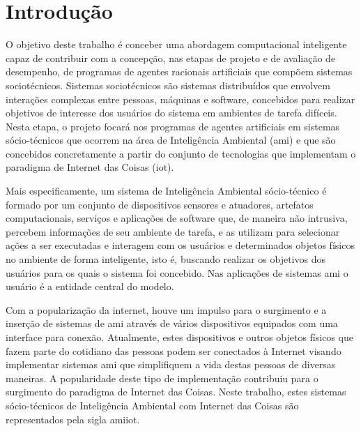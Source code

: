  \chapter{Introdução}
\label{cap:introducao}
    
    

    O objetivo deste trabalho é conceber uma abordagem computacional inteligente capaz de contribuir com a concepção, nas etapas de projeto e de avaliação de desempenho, de programas de agentes racionais artificiais que compõem sistemas sociotécnicos. Sistemas sociotécnicos são sistemas distribuídos que envolvem interações complexas entre pessoas, máquinas e software, concebidos para realizar objetivos de interesse dos usuários do sistema em ambientes de tarefa difíceis. Nesta etapa, o projeto focará nos programas de agentes artificiais em sistemas sócio-técnicos que ocorrem na área de Inteligência Ambiental (\acrshort{ami}) e que são concebidos concretamente a partir do conjunto de tecnologias que implementam o paradigma de Internet das Coisas (\acrshort{iot}).

    Mais especificamente, um sistema de Inteligência Ambiental sócio-técnico é formado por um conjunto de dispositivos sensores e atuadores, artefatos computacionais, serviços e aplicações de software que, de maneira não intrusiva, percebem informações de seu ambiente de tarefa, e as utilizam para selecionar ações a ser executadas e interagem com os usuários e determinados objetos físicos no ambiente de forma inteligente, isto é, buscando realizar os objetivos dos usuários para os quais o sistema foi concebido. Nas aplicações de sistemas \acrshort{ami} o usuário é a entidade central do modelo.
    
    
    Com a popularização da internet, houve um impulso para o surgimento e a inserção de sistemas de \acrshort{ami} através de vários dispositivos equipados com uma interface para conexão. Atualmente, estes dispositivos e outros objetos físicos que fazem parte do cotidiano das pessoas podem ser conectados à Internet visando implementar sistemas \acrshort{ami} que simplifiquem a vida destas pessoas de diversas maneiras. A popularidade deste tipo de implementação contribuiu para o surgimento do paradigma de Internet das Coisas. Neste trabalho, estes sistemas sócio-técnicos de Inteligência Ambiental com Internet das Coisas são representados pela sigla \acrshort{amiiot}.
    
